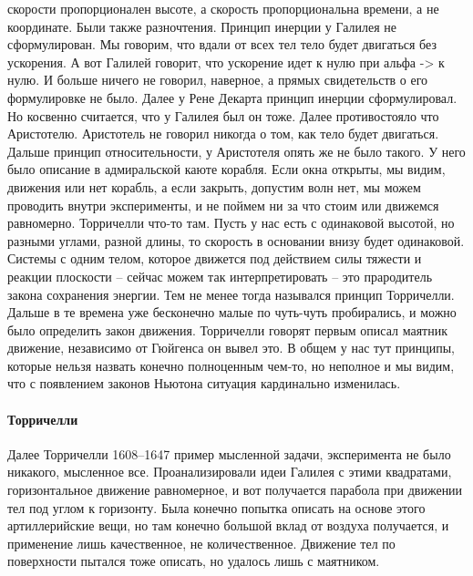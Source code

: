 \documentclass[a4paper, 12pt]{article}
\begin{document}
скорости пропорционален высоте, а скорость пропорциональна времени, а не 
координате. Были также разночтения. Принцип инерции у Галилея не 
сформулирован. Мы говорим, что вдали от всех тел тело будет двигаться 
без ускорения. А вот Галилей говорит, что ускорение идет к нулю при 
альфа -> к нулю. И больше ничего не говорил, наверное, а прямых 
свидетельств о его формулировке не было. Далее у Рене Декарта принцип 
инерции сформулировал. Но косвенно считается, что у Галилея был он тоже. 
Далее противостояло что Аристотелю. Аристотель не говорил никогда о том, 
как тело будет двигаться. Дальше принцип относительности, у Аристотеля 
опять же не было такого. У него было описание в адмиральской каюте 
корабля. Если окна открыты, мы видим, движения или нет корабль, а если 
закрыть, допустим волн нет, мы можем проводить внутри эксперименты, и не 
поймем ни за что стоим или движемся равномерно. Торричелли что-то там. 
Пусть у нас есть с одинаковой высотой, но разными углами, разной длины, 
то скорость в основании внизу будет одинаковой. Системы с одним телом, 
которое движется под действием силы тяжести и реакции плоскости -- 
сейчас можем так интерпретировать -- это прародитель закона сохранения 
энергии. Тем не менее тогда назывался принцип Торричелли. Дальше в те 
времена уже бесконечно малые по чуть-чуть пробирались, и можно было 
определить закон движения. Торричелли говорят первым описал маятник 
движение, независимо от Гюйгенса он вывел это. В общем у нас тут 
принципы, которые нельзя назвать конечно полноценным чем-то, но неполное 
и мы видим, что с появлением законов Ньютона ситуация кардинально 
изменилась.

\paragraph{Торричелли}
Далее Торричелли 1608--1647 пример мысленной задачи, эксперимента не было 
никакого, мысленное все. Проанализировали идеи Галилея с этими 
квадратами, горизонтальное движение равномерное, и вот получается 
парабола при движении тел под углом к горизонту. Была конечно попытка 
описать на основе этого артиллерийские вещи, но там конечно большой 
вклад от воздуха получается, и применение лишь качественное, не 
количественное. Движение тел по поверхности пытался тоже описать, но 
удалось лишь с маятником.
\end{document}
